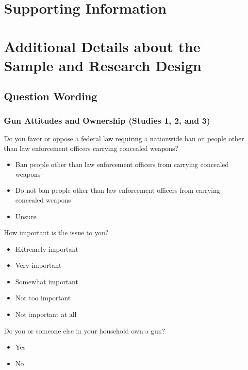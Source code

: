 \clearpage
\section*{Supporting Information}
\setcounter{section}{0}
\setcounter{table}{0}
\setcounter{figure}{0}
\renewcommand\thetable{SI\arabic{table}}
\renewcommand\thefigure{SI\arabic{figure}}
\section{Additional Details about the Sample and Research Design}

\subsection{Question Wording}
\label{sec:qwording}
\singlespacing
\setlength{\parindent}{0cm} 

\subsubsection{Gun Attitudes and Ownership (Studies 1, 2, and 3)}
Do you favor or oppose a federal law requiring a nationwide ban on people other than law enforcement officers carrying concealed weapons?
\vspace{-3mm}
\begin{itemize}
\setlength\itemsep{-.5em}
  \item Ban people other than law enforcement officers from carrying concealed weapons
  \item Do not ban people other than law enforcement officers from carrying concealed weapons
  \item Unsure
\end{itemize}

How important is the issue to you?
\vspace{-3mm}
\begin{itemize}
\setlength\itemsep{-.5em}
  \item Extremely important
  \item Very important
  \item Somewhat important
  \item Not too important
  \item Not important at all
\end{itemize}

Do you or someone else in your household own a gun?
\vspace{-3mm}
\begin{itemize}
\setlength\itemsep{-.5em}
  \item Yes
  \item No
\end{itemize}

